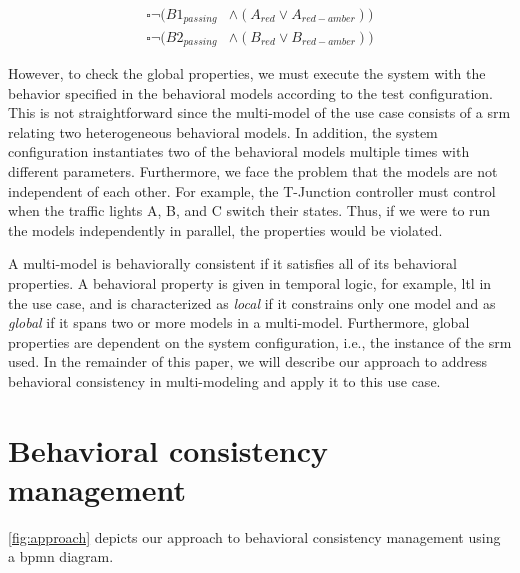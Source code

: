 \documentclass{jot}
\begin{document}
\begin{align}
    \square\neg(B1_{passing} & \land (A_{red} \lor A_{red-amber})) \label{eq:property3} \\
    \square\neg(B2_{passing} & \land (B_{red} \lor B_{red-amber})) \label{eq:property4}
\end{align}

However, to check the global properties, we must execute the system with the behavior specified in the behavioral models according to the test configuration.
This is not straightforward since the multi-model of the use case consists of a \gls*{srm} relating two heterogeneous behavioral models.
In addition, the system configuration instantiates two of the behavioral models multiple times with different parameters.
Furthermore, we face the problem that the models are not independent of each other.
For example, the T-Junction controller must control when the traffic lights A, B, and C switch their states.
Thus, if we were to run the models independently in parallel, the properties would be violated.

A multi-model is behaviorally consistent if it satisfies all of its behavioral properties.
A behavioral property is given in temporal logic, for example, \gls*{ltl} in the use case, and is characterized as \emph{local} if it constrains only one model and as \emph{global} if it spans two or more models in a multi-model.
Furthermore, global properties are dependent on the system configuration, i.e., the instance of the \gls*{srm} used.
In the remainder of this paper, we will describe our approach to address behavioral consistency in multi-modeling and apply it to this use case.


\section{Behavioral consistency management} \label{sec:behavioral_consistency_checking}
\autoref{fig:approach} depicts our approach to behavioral consistency management using a \gls*{bpmn} diagram.
\end{document}
